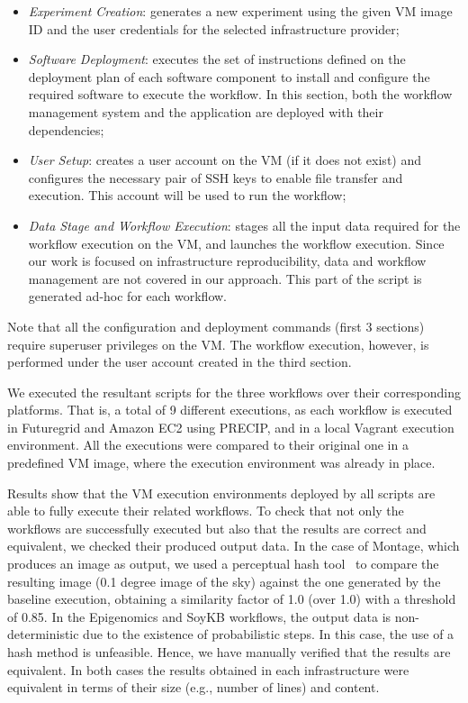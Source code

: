 \begin{itemize}
	\item \emph{Experiment Creation}: generates a new experiment using the 
		given VM image ID and the user credentials for the selected infrastructure 
		provider;
    	    
	\item \emph{Software Deployment}: executes the set of instructions defined on 
		the deployment plan of each software component to install and configure 
		the required software to execute the workflow. In this section, both the 
		workflow management system and the application are deployed with their 
		dependencies;

	\item \emph{User Setup}: creates a user account on the VM (if it does not exist) 
		and configures the necessary pair of SSH keys to enable file transfer and 
		execution. This account will be used to run the workflow;
	   
	\item \emph{Data Stage and Workflow Execution}: stages all the input data required 
		for the workflow execution on the VM, and launches the workflow execution. 
		Since our work is focused on infrastructure reproducibility, data and workflow 
		management are not covered in our approach. This part of the script is 
		generated ad-hoc for each workflow.
\end{itemize}

\noindent Note that all the configuration and deployment commands (first 3 sections) 
require superuser privileges on the VM. The workflow execution, however, is performed 
under the user account created in the third section.

We executed the resultant scripts for the three workflows over their corresponding 
platforms. That is, a total of 9 different executions, as each workflow is executed in 
Futuregrid and Amazon EC2 using PRECIP, and in a local Vagrant execution 
environment. All the executions were compared to their original one in a predefined 
VM image, where the execution environment was already in place.

Results show that the VM execution environments deployed by all scripts are able to
fully execute their related workflows. To check that not only the workflows are successfully executed but also 
that the results are correct and equivalent, we checked their produced output data. In the 
case of Montage, which produces an image as output, we used a perceptual hash tool~\cite{phash}
to compare the resulting image (0.1 degree image of the sky) against the one generated 
by the baseline execution, obtaining a similarity factor of 1.0 (over 1.0) with a threshold of 
0.85. In the Epigenomics and SoyKB workflows, the output data is non-deterministic due to
the existence of probabilistic steps. In this case, the use of a hash method is unfeasible. 
Hence, we have manually verified that the results are equivalent. In both cases the results 
obtained in each infrastructure were equivalent in terms of their size (e.g., number of lines) 
and content.

